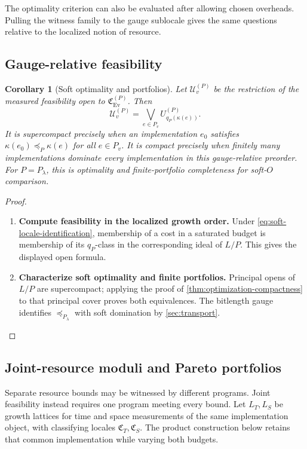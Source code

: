 \documentclass[11pt,a4paper]{article}
\numberwithin{algorithm}{section}
\numberwithin{equation}{section}
\newtheorem{corollary}[corollary]{Corollary}
\theoremstyle{definition}
\theoremstyle{remark}
\theoremstyle{plain}
\newcommand{\Ev}{{\operatorname{Ev}}}
\newcommand{\Cplx}{\mathfrak C_{\Ev}}
\theoremstyle{definition}
\theoremstyle{plain}
\begin{document}
The optimality criterion can also be evaluated after allowing chosen
overheads. Pulling the witness family to the gauge sublocale gives
the same questions relative to the localized notion of resource.

\subsection{Gauge-relative feasibility}
\begin{corollary}[Soft optimality and portfolios]
\label{cor:soft-optimization}
Let $\mathcal U_v^{(P)}$ be the restriction of the measured
feasibility open to $\Cplx^{(P)}$.  Then
\[
 \mathcal U_v^{(P)}
   =\bigvee_{e\in P_v}U^{(P)}_{q_P(\kappa(e))}.
\]
It is supercompact precisely when an implementation $e_0$
satisfies $\kappa(e_0)\preceq_P\kappa(e)$ for all $e\in P_v$.
It is compact precisely when finitely many implementations
dominate every implementation in this gauge-relative preorder.
For $P=P_\lambda$, this is optimality and finite-portfolio
completeness for soft-$O$ comparison.
\end{corollary}
\begin{proof}\leavevmode
\begin{enumerate}[leftmargin=*,align=left]
\item \textbf{Compute feasibility in the localized growth order.}
Under \eqref{eq:soft-locale-identification}, membership of a
cost in a saturated budget is membership of its $q_P$-class
in the corresponding ideal of $L/P$.  This gives the displayed
open formula.

\item \textbf{Characterize soft optimality and finite portfolios.}
Principal opens of $L/P$ are supercompact;
applying the proof of \cref{thm:optimization-compactness}
to that principal cover proves both equivalences.  The bitlength
gauge identifies $\preceq_{P_\lambda}$ with soft domination by
\cref{sec:transport}.
\end{enumerate}
\end{proof}

\subsection{Joint-resource moduli and Pareto portfolios}
\label{sec:multi-resource-moduli}
Separate resource bounds may be witnessed by different programs.
Joint feasibility instead requires one program meeting every bound.
Let $L_T,L_S$ be growth lattices for time and space measurements
of the same implementation object, with classifying locales
$\mathfrak C_T,\mathfrak C_S$. The product construction below
retains that common implementation while varying both budgets.
\end{document}
